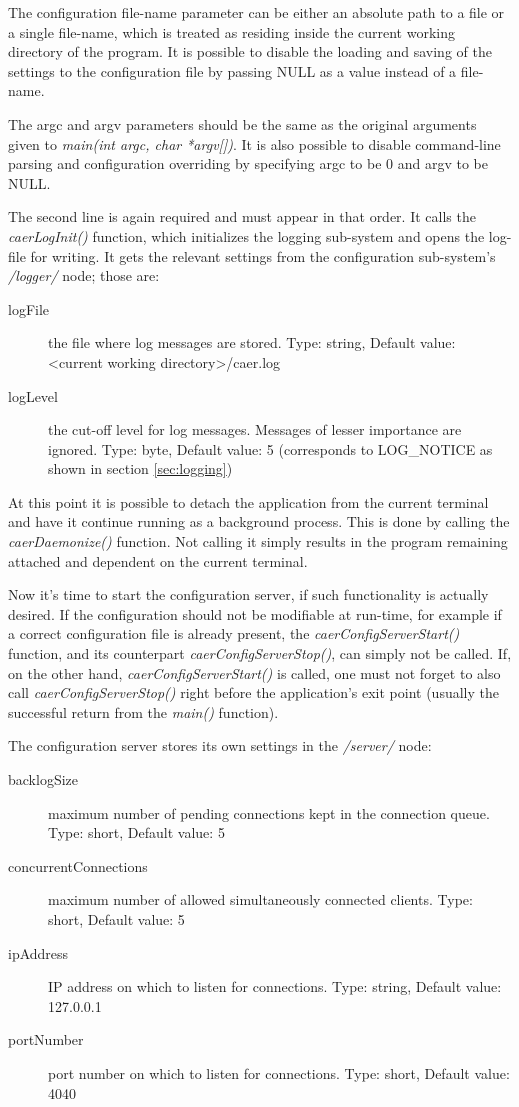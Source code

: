 \documentclass[a4paper,12pt]{report}
\begin{document}
The configuration file-name parameter can be either an absolute path to a file or a single file-name, which is treated as residing inside the current working directory of the program.
It is possible to disable the loading and saving of the settings to the configuration file by passing NULL as a value instead of a file-name.

The argc and argv parameters should be the same as the original arguments given to \emph{main(int argc, char *argv[])}.
It is also possible to disable command-line parsing and configuration overriding by specifying argc to be 0 and argv to be NULL.

The second line is again required and must appear in that order. It calls the \emph{caerLogInit()} function, which initializes the logging sub-system and opens the log-file for writing.
It gets the relevant settings from the configuration sub-system's \emph{/logger/} node; those are:
\begin{description}
\item[logFile] the file where log messages are stored.
\subitem Type: string, Default value: <current working directory>/caer.log
\item[logLevel] the cut-off level for log messages. Messages of lesser importance are ignored.
\subitem Type: byte, Default value: 5 (corresponds to LOG\_NOTICE as shown in section \ref{sec:logging})
\end{description}

At this point it is possible to detach the application from the current terminal and have it continue running as a background process. This is done by calling the \emph{caerDaemonize()} function. Not calling it simply results in the program remaining attached and dependent on the current terminal.

Now it's time to start the configuration server, if such functionality is actually desired. If the configuration should not be modifiable at run-time, for example if a correct configuration file is already present, the \emph{caerConfigServerStart()} function, and its counterpart \emph{caerConfigServerStop()}, can simply not be called.
If, on the other hand, \emph{caerConfigServerStart()} is called, one must not forget to also call \emph{caerConfigServerStop()} right before the application's exit point (usually the successful return from the \emph{main()} function).

The configuration server stores its own settings in the \emph{/server/} node:
\begin{description}
\item[backlogSize] maximum number of pending connections kept in the connection queue.
\subitem Type: short, Default value: 5
\item[concurrentConnections] maximum number of allowed simultaneously connected clients.
\subitem Type: short, Default value: 5
\item[ipAddress] IP address on which to listen for connections.
\subitem Type: string, Default value: 127.0.0.1
\item[portNumber] port number on which to listen for connections.
\subitem Type: short, Default value: 4040
\end{description}
\end{document}
